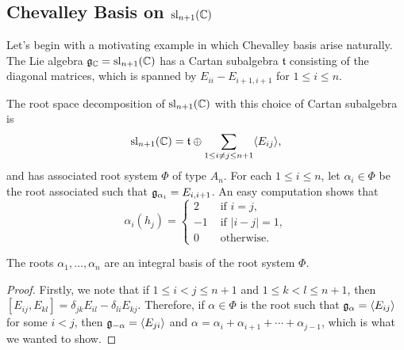 \iffalse\begin{theorem}[Chevalley, 1955]
    Let $\fg_\CC$ be a complex simple Lie algebra. Then $\fg_\CC$ has a Chevalley basis. Moreover, the structure constants of any Chevalley basis are integral.
\end{theorem}\fi












\subsection{Chevalley Basis on \texorpdfstring{$\mathrm{sl}_{n+1}(\mathbb{C})$}{PDFstring}}\label{sec:chevbasis_sl}

Let's begin with a motivating example in which Chevalley basis arise naturally. The Lie algebra $\mathfrak{g}_{\mathbb{C}}=\mathrm{sl}_{n+1}(\mathbb{C})$ has a Cartan subalgebra $\mathfrak{t}$ consisting of the diagonal matrices, which is spanned by $E_{ii}-E_{i+1,i+1}$ for $1\leq i\leq n$. %

The root space decomposition of $\mathrm{sl}_{n+1}(\mathbb{C})$ with this choice of Cartan subalgebra is 
$$\mathrm{sl}_{n+1}(\mathbb{C})=\mathfrak{t}\oplus\sum_{1\leq i\neq j\leq n+1}\langle E_{ij}\rangle,$$
and has associated root system $\Phi$ of type $A_n$. For each $1\leq i\leq n$, let $\alpha_i\in\Phi$ be the root associated such that $\mathfrak{g}_{\alpha_i}=E_{i,i+1}$. An easy computation shows that 
$$\alpha_i(h_j)=\begin{cases}
    2 & \text{ if } i=j,\\
    -1 & \text{ if } |i-j|=1,\\
    0 & \text{ otherwise.}
\end{cases}$$

\begin{lemma}
    The roots $\alpha_1,\ldots,\alpha_n$ are an integral basis of the root system $\Phi$.
\end{lemma}
\begin{proof}
    Firstly, we note that if $1\leq i<j\leq n+1$ and $1\leq k<l\leq n+1$, then $[E_{ij},E_{kl}]=\delta_{jk}E_{il}-\delta_{li}E_{kj}$. %
    Therefore, if $\alpha\in\Phi$ is the root such that $\mathfrak{g}_\alpha=\langle E_{ij}\rangle$ for some $i<j$, then $\mathfrak{g}_{-\alpha}=\langle E_{ji}\rangle$ and $\alpha=\alpha_i+\alpha_{i+1}+\cdots+\alpha_{j-1}$, which is what we wanted to show.
\end{proof}

